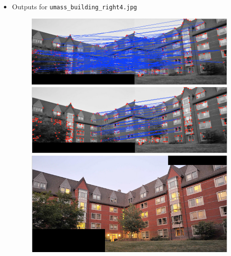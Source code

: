 \documentclass[10pt,letterpaper]{article}
\newcommand{\cmd}[1] {{\color{blue}\texttt{#1}}}
\begin{document}
\begin{itemize}
\item Outputs for \cmd{umass\_building\_right4.jpg}
\begin{figure}[h]
\centering
\includegraphics[width=0.9\linewidth]{../latex/allmatches.png} \\
\includegraphics[width=0.9\linewidth]{../latex/inliers.png} \\
\includegraphics[width=0.9\linewidth]{../latex/result.png} \\
\end{figure}
\newpage


\end{itemize}
\end{document}

